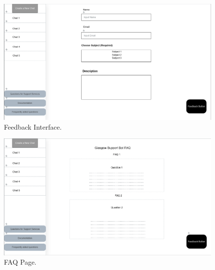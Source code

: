 \documentclass{l4proj}
\begin{document}
\begin{appendices}
\begin{figure}[h!]
  \centering
  \begin{adjustbox}{center,max height=0.4\textheight, max width=\linewidth}
    \includegraphics{images/wireframecfeedbackpage.png}
  \end{adjustbox}
  \caption{Feedback Interface.}
\end{figure}


\begin{figure}[h!]
  \centering
  \begin{adjustbox}{center,max height=0.4\textheight, max width=\linewidth}
    \includegraphics{images/wireframefaqpage.png}
  \end{adjustbox}
  \caption{FAQ Page.}
\end{figure}


\end{appendices}
\end{document}
